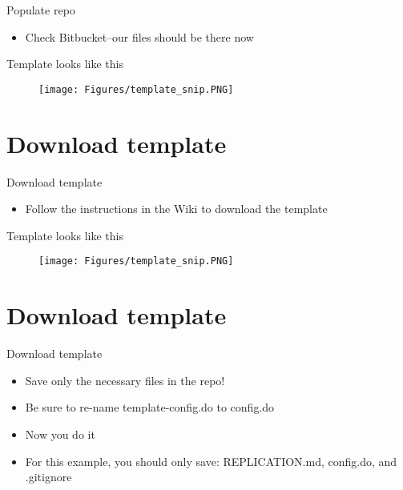 \documentclass[xcolor={dvipsnames}]{beamer}
\theoremstyle{definition}
\begin{document}
\begin{frame}{Populate repo}
\begin{itemize}
	\item Check Bitbucket--our files should be there now
\end{itemize}
\end{frame}


\begin{frame}{Template looks like this}
\begin{figure}
    \centering
    \texttt{[image: Figures/template\_snip.PNG]}
\end{figure}
\end{frame}

\section{Download template}
\begin{frame}{Download template}
\begin{itemize}
    \item Follow the instructions in the Wiki to download the template
\end{itemize}
\end{frame}

\begin{frame}{Template looks like this}
\begin{figure}
    \centering
    \texttt{[image: Figures/template\_snip.PNG]}
\end{figure}
\end{frame}

\section{Download template}
\begin{frame}{Download template}
\begin{itemize}
    \item Save only the necessary files in the repo!
    \item Be sure to re-name template-config.do to config.do
    \pause
    \item Now you do it
    \pause
    \item For this example, you should only save: REPLICATION.md, config.do, and .gitignore 
\end{itemize}
\end{frame}
\end{document}
